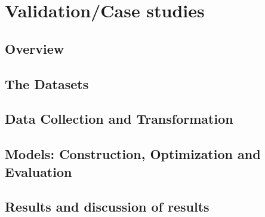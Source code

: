 \chapter{Validation/Case studies}

\section{Overview}

\section{The Datasets}

\section{Data Collection and Transformation}

\section{Models: Construction, Optimization and Evaluation}

\section{Results and discussion of results}